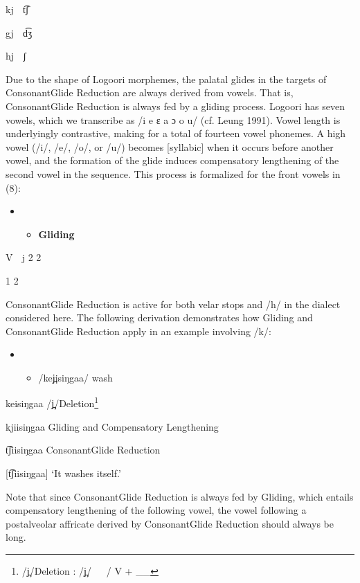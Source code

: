 kj  t͡ʃ

gj  d͡ʒ

hj  ʃ

Due to the shape of Logoori morphemes, the palatal glides in the targets of ConsonantGlide Reduction are always derived from vowels. That is, ConsonantGlide Reduction is always fed by a gliding process. Logoori has seven vowels, which we transcribe as /i e ɛ a ɔ o u/ (cf. Leung 1991). Vowel length is underlyingly contrastive, making for a total of fourteen vowel phonemes. A high vowel (/i/, /e/, /o/, or /u/) becomes [syllabic] when it occurs before another vowel, and the formation of the glide induces compensatory lengthening of the second vowel in the sequence. This process is formalized for the front vowels in (8):

\begin{itemize}
\item \setcounter{itemize}{0}
\begin{itemize}
\item \textbf{Gliding}

\end{itemize}
\end{itemize}

V  j 2 2

 1    2

ConsonantGlide Reduction is active for both velar stops and /h/ in the dialect considered here. The following derivation demonstrates how Gliding and ConsonantGlide Reduction apply in an example involving /k/:

\begin{itemize}
\item \setcounter{itemize}{0}
\begin{itemize}
\item /kej̪isiŋgaa/  wash\textsc{ }

\end{itemize}
\end{itemize}

keisiŋgaa    /j̪/Deletion\footnote{   /j̪/Deletion \citep[116]{Leung1991}: /j̪/   / V + \_\_ }

kjiisiŋgaa    Gliding and Compensatory Lengthening

t͡ʃiisiŋgaa    ConsonantGlide Reduction

[t͡ʃiisiŋgaa]  ‘It washes itself.’

Note that since ConsonantGlide Reduction is always fed by Gliding, which entails compensatory lengthening of the following vowel, the vowel following a postalveolar affricate derived by ConsonantGlide Reduction should always be long.

